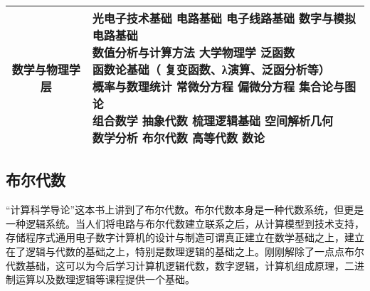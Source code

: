 \documentclass{article}
\begin{document}
\begin{table}[h]
\begin{tabular}{c|l|}
    \hline
    数学与物理学层 & \makecell[l]{光电子技术基础 \quad 电路基础 \quad 电子线路基础 \quad 数字与模拟电路基础 \\ 数值分析与计算方法 \quad 大学物理学 \quad 泛函数 \\ 函数论基础（ 复变函数、λ演算、泛函分析等）  \\ 概率与数理统计 \quad 常微分方程 \quad 偏微分方程 \quad 集合论与图论 \\ 组合数学 \quad 抽象代数 \quad 梳理逻辑基础 \quad 空间解析几何 \\ 数学分析 \quad 布尔代数 \quad 高等代数 \quad 数论}\\
    \hline
\end{tabular}
    \label{table1}
\end{table}
\citep{zhao}
\subsection{布尔代数}
“计算科学导论”这本书上讲到了布尔代数。布尔代数本身是一种代数系统，但更是一种逻辑系统。当人们将电路与布尔代数建立联系之后，从计算模型到技术支持，存储程序式通用电子数字计算机的设计与制造可谓真正建立在数学基础之上，建立在了逻辑与代数的基础之上，特别是数理逻辑的基础之上。刚刚解除了一点点布尔代数基础，这可以为今后学习计算机逻辑代数，数字逻辑，计算机组成原理，二进制运算以及数理逻辑等课程提供一个基础。\citep{zhao}\par
\end{document}
